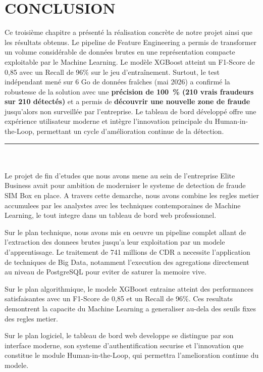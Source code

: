 \documentclass[12pt, oneside, a4paper]{report}
\newcommand{\chapterhead}[1]{%
  \noindent\rule[-0.2cm]{0.45cm}{1.2cm}\hspace{0.15cm}%
  \raisebox{0.85cm}{\rule{0.85\textwidth}{0.5pt}}\\[0.3cm]
  \noindent\hspace*{0.6cm}{\Huge\textbf{#1}}\\[1.5cm]
}
\begin{document}
\section{CONCLUSION}
Ce troisième chapitre a présenté la réalisation concrète de notre projet ainsi que les résultats obtenus. Le pipeline de Feature Engineering a permis de transformer un volume considérable de données brutes en une représentation compacte exploitable par le Machine Learning. Le modèle XGBoost atteint un F1-Score de 0,85 avec un Recall de 96\% sur le jeu d'entraînement. Surtout, le test indépendant mené sur 6 Go de données fraîches (mai 2026) a confirmé la robustesse de la solution avec une \textbf{précision de 100~\% (210 vrais fraudeurs sur 210 détectés)} et a permis de \textbf{découvrir une nouvelle zone de fraude} jusqu'alors non surveillée par l'entreprise. Le tableau de bord développé offre une expérience utilisateur moderne et intègre l'innovation principale du Human-in-the-Loop, permettant un cycle d'amélioration continue de la détection.


\clearpage
\thispagestyle{plain}
\chapterhead{CONCLUSION GÉNÉRALE}

Le projet de fin d'etudes que nous avons mene au sein de l'entreprise Elite Business avait pour ambition de moderniser le systeme de detection de fraude SIM Box en place. A travers cette demarche, nous avons combine les regles metier accumulees par les analystes avec les techniques contemporaines de Machine Learning, le tout integre dans un tableau de bord web professionnel.

Sur le plan technique, nous avons mis en oeuvre un pipeline complet allant de l'extraction des donnees brutes jusqu'a leur exploitation par un modele d'apprentissage. Le traitement de 741 millions de CDR a necessite l'application de techniques de Big Data, notamment l'execution des agregations directement au niveau de PostgreSQL pour eviter de saturer la memoire vive.

Sur le plan algorithmique, le modele XGBoost entraine atteint des performances satisfaisantes avec un F1-Score de 0,85 et un Recall de 96\%. Ces resultats demontrent la capacite du Machine Learning a generaliser au-dela des seuils fixes des regles metier.

Sur le plan logiciel, le tableau de bord web developpe se distingue par son interface moderne, son systeme d'authentification securise et l'innovation que constitue le module Human-in-the-Loop, qui permettra l'amelioration continue du modele.
\end{document}
